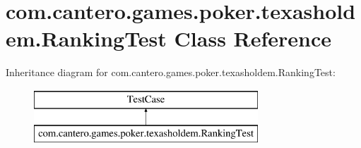 \hypertarget{classcom_1_1cantero_1_1games_1_1poker_1_1texasholdem_1_1_ranking_test}{}\section{com.\+cantero.\+games.\+poker.\+texasholdem.\+Ranking\+Test Class Reference}
\label{classcom_1_1cantero_1_1games_1_1poker_1_1texasholdem_1_1_ranking_test}
Inheritance diagram for com.\+cantero.\+games.\+poker.\+texasholdem.\+Ranking\+Test\+:\begin{figure}[H]
\begin{center}
\leavevmode
\includegraphics[height=2.000000cm]{classcom_1_1cantero_1_1games_1_1poker_1_1texasholdem_1_1_ranking_test}
\end{center}
\end{figure}
